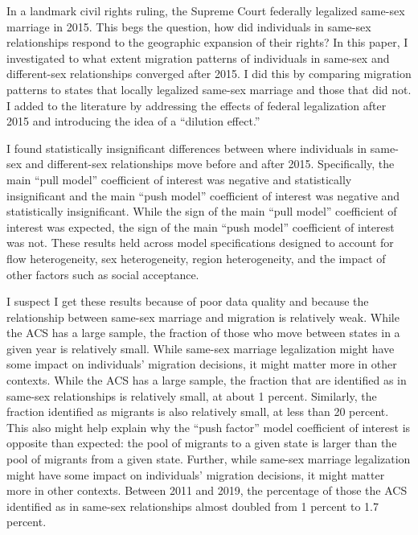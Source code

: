 \documentclass[12pt,letterpaper]{article}
\begin{document}
In a landmark civil rights ruling, the Supreme Court federally legalized same-sex marriage in 2015. This begs the question, how did individuals in same-sex relationships respond to the geographic expansion of their rights? In this paper, I investigated to what extent migration patterns of individuals in same-sex and different-sex relationships converged after 2015. I did this by comparing migration patterns to states that locally legalized same-sex marriage and those that did not. I added to the literature by addressing the effects of federal legalization after 2015 and introducing the idea of a “dilution effect.”

I found statistically insignificant differences between where individuals in same-sex and different-sex relationships move before and after 2015. Specifically, the main “pull model” coefficient of interest was negative and statistically insignificant and the main “push model” coefficient of interest was negative and statistically insignificant. While the sign of the main “pull model” coefficient of interest was expected, the sign of the main “push model” coefficient of interest was not. These results held across model specifications designed to account for flow heterogeneity, sex heterogeneity, region heterogeneity, and the impact of other factors such as social acceptance. 

I suspect I get these results because of poor data quality and because the relationship between same-sex marriage and migration is relatively weak. While the ACS has a large sample, the fraction of those who move between states in a given year is relatively small. While same-sex marriage legalization might have some impact on individuals’ migration decisions, it might matter more in other contexts. While the ACS has a large sample, the fraction that are identified as in same-sex relationships is relatively small, at about 1 percent. Similarly, the fraction identified as migrants is also relatively small, at less than 20 percent. This also might help explain why the “push factor” model coefficient of interest is opposite than expected: the pool of migrants to a given state is larger than the pool of migrants from a given state. Further, while same-sex marriage legalization might have some impact on individuals’ migration decisions, it might matter more in other contexts. Between 2011 and 2019, the percentage of those the ACS identified as in same-sex relationships almost doubled from 1 percent to 1.7 percent.
\end{document}
